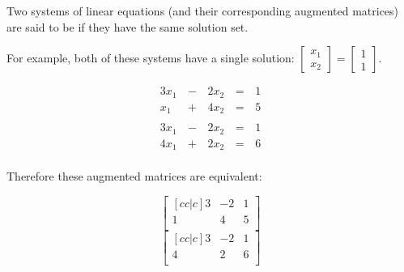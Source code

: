 \begin{applicationActivities}{1}{3}
\begin{definition}
  Two systems of linear equations (and their corresponding augmented
  matrices) are said to be  if they have the same
  solution set.

  For example, both of these systems have a single solution:
  \(\begin{bmatrix} x_1 \\ x_2 \end{bmatrix} = \begin{bmatrix} 1 \\ 1\end{bmatrix}\).

  \begin{multicols}{2}\noindent
    \begin{alignat*}{3}
      3x_1 &\,-\,& 2x_2 &\,=\,& 1 \\
      x_1 &\,+\,& 4x_2 &\,=\,& 5 \\
    \end{alignat*}
    \begin{alignat*}{3}
      3x_1 &\,-\,& 2x_2 &\,=\,& 1 \\
      4x_1 &\,+\,& 2x_2 &\,=\,& 6 \\
    \end{alignat*}
  \end{multicols}

  Therefore these augmented matrices are equivalent:

  \begin{multicols}{2}\noindent
    \[
      \begin{bmatrix}[cc|c]
        3 & -2 & 1\\
        1 &  4 & 5\\
      \end{bmatrix}
    \]
    \[
      \begin{bmatrix}[cc|c]
        3 & -2 & 1\\
        4 &  2 & 6\\
      \end{bmatrix}
    \]
  \end{multicols}
\end{definition}


\end{applicationActivities}
